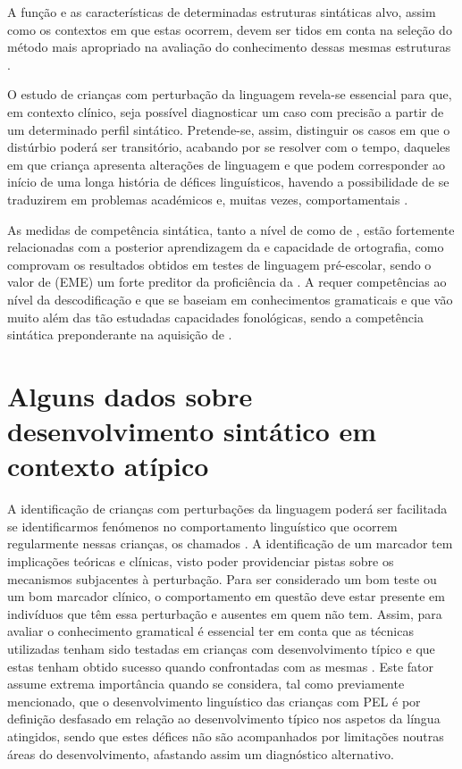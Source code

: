 \documentclass[output=paper]{LSP/langsci}
\begin{document}
A função e as características de determinadas estruturas sintáticas alvo, assim como os contextos em que estas ocorrem, devem ser tidos em conta na seleção do método mais apropriado na avaliação do conhecimento dessas mesmas estruturas \citep{zukowski2004}.

O estudo de crianças com perturbação da linguagem revela-se essencial para que, em contexto clínico, seja possível diagnosticar um caso com precisão a partir de um determinado perfil sintático. Pretende-se, assim, distinguir os casos em que o distúrbio poderá ser transitório, acabando por se resolver com o tempo, daqueles em que criança apresenta alterações de linguagem e que podem corresponder ao início de uma longa história de défices linguísticos, havendo a possibilidade de se traduzirem em problemas académicos e, muitas vezes, comportamentais \citep{bishopedmunson1987}. 

As medidas de competência sintática, tanto a nível de  como de , estão fortemente relacionadas com a posterior aprendizagem da  e capacidade de ortografia, como comprovam os resultados obtidos em testes de linguagem pré-escolar, sendo o valor de  (EME) um forte preditor da proficiência da  \citep{bishopadams1990}. A  requer competências ao nível da descodificação e  que se baseiam em conhecimentos gramaticais e que vão muito além das tão estudadas capacidades fonológicas, sendo a competência sintática preponderante na aquisição de  \citep{schuele2004}. 
\section{Alguns dados sobre desenvolvimento sintático em contexto atípico}
\label{sec:martins_dados}

A identificação de crianças com perturbações da linguagem poderá ser facilitada se identificarmos fenómenos no comportamento linguístico que ocorrem regularmente nessas crianças, os chamados . A identificação de um marcador tem implicações teóricas e clínicas, visto poder providenciar pistas sobre os mecanismos subjacentes à perturbação. Para ser considerado um bom teste ou um bom marcador clínico, o comportamento em questão deve estar presente em indivíduos que têm essa perturbação e ausentes em quem não tem. Assim, para avaliar o conhecimento gramatical é essencial ter em conta que as técnicas utilizadas tenham sido testadas em crianças com desenvolvimento típico e que estas tenham obtido sucesso quando confrontadas com as mesmas \citep{zukowski2004}. Este fator assume extrema importância quando se considera, tal como previamente mencionado, que o desenvolvimento linguístico das crianças com PEL é por definição desfasado em relação ao desenvolvimento típico nos aspetos da língua atingidos, sendo que estes défices não são acompanhados por limitações noutras áreas do desenvolvimento, afastando assim um diagnóstico alternativo. 
\end{document}
